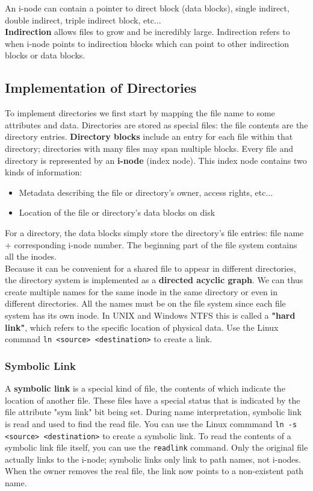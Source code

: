 \documentclass{article}
\newcommand{\bold}[1]{\textbf{#1}}
\renewcommand{\b}{\item[$\circ$]}
\newcommand{\newlist}{\begin{itemize}}
\renewcommand{\endlist}{\end{itemize}}
\newcommand{\code}[1]{\texttt{#1}}
\begin{document}
An i-node can contain a pointer to direct block (data blocks), single indirect, double indirect, triple indirect block, etc... \\ 

\bold{Indirection} allows files to grow and be incredibly large. Indirection refers to when i-node points to indirection blocks which can point to other indirection blocks or data blocks. 

\subsection{Implementation of Directories}

To implement directories we first start by mapping the file name to some attributes and data. Directories are stored as special files: the file contents are the directory entries. \bold{Directory blocks} include an entry for each file within that directory; directories with many files may span multiple blocks. Every file and directory is represented by an \bold{i-node} (index node). This index node contains two kinds of information:

\newlist 
\b Metadata describing the file or directory's owner, access rights, etc...
\b Location of the file or directory's data blocks on disk
\endlist 

For a directory, the data blocks simply store the directory's file entries: file name + corresponding i-node number. The beginning part of the file system contains all the inodes. \\ 

Because it can be convenient for a shared file to appear in different directories, the directory system is implemented as a \bold{directed acyclic graph}. We can thus create multiple names for the same inode in the same directory or even in different directories. All the names must be on the file system since each file system has its own inode. In UNIX and Windows NTFS this is called a \bold{"hard link"}, which refers to the specific location of physical data. Use the Linux commnad \code{ln <source> <destination>} to create a link. \\ 

\subsubsection{Symbolic Link}

A \bold{symbolic link} is a special kind of file, the contents of which indicate the location of another file. These files have a special status that is indicated by the file attribute "sym link" bit being set. During name interpretation, symbolic link is read and used to find the read file. You can use the Linux commmand \code{ln -s <source> <destination>} to create a symbolic link. To read the contents of a symbolic link file itself, you can use the \code{readlink} command. Only the original file actually links to the i-node; symbolic links only link to path names, not i-nodes. When the owner removes the real file, the link now points to a non-existent path name. \\ 
\end{document}
